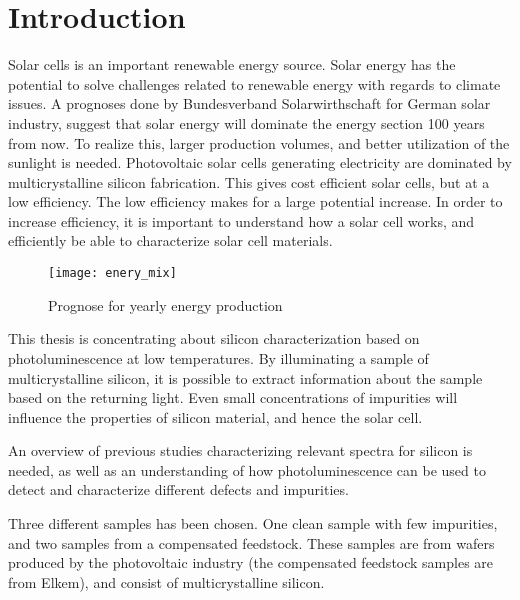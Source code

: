 
\section{Introduction}

Solar cells is an important renewable energy source. Solar energy has the potential to solve challenges related to renewable energy with regards to climate issues. A prognoses done by Bundesverband Solarwirthschaft for German solar industry, suggest that solar energy will dominate the energy section 100 years from now. To realize this, larger production volumes, and better utilization of the sunlight is needed. Photovoltaic solar cells generating electricity are dominated by multicrystalline silicon fabrication. This gives cost efficient solar cells, but at a low efficiency. The low efficiency makes for a large potential increase. In order to increase efficiency, it is important to understand how a solar cell works, and efficiently be able to characterize solar cell materials.


\begin{figure}[H]
\texttt{[image: enery\_mix]}%
\caption{Prognose for yearly energy production}%
\label{fig:energimix}%
\end{figure}

This thesis is concentrating about silicon characterization based on photoluminescence at low temperatures. By illuminating a sample of multicrystalline silicon, it is possible to extract information about the sample based on the returning light. Even small concentrations of impurities will influence the properties of silicon material, and hence the solar cell. 

An overview of previous studies characterizing relevant spectra for silicon is needed, as well as an understanding of how photoluminescence can be used to detect and characterize different defects and impurities. 

Three different samples has been chosen. One clean sample with few impurities, and two samples from a compensated feedstock. These samples are from wafers produced by the photovoltaic industry (the compensated feedstock samples are from Elkem), and consist of multicrystalline silicon.
